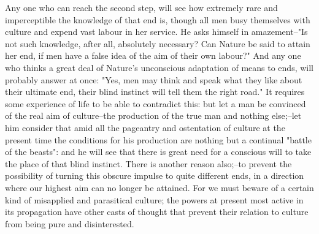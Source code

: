 Any one who can reach the second step, will see how extremely rare
and imperceptible the knowledge of that end is, though all men busy
themselves with culture and expend vast labour in her service. He
asks himself in amazement--"Is not such knowledge, after all,
absolutely necessary? Can Nature be said to attain her end, if men
have a false idea of the aim of their own labour?" And any one who
thinks a great deal of Nature's unconscious adaptation of means to
ends, will probably answer at once: "Yes, men may think and speak
what they like about their ultimate end, their blind instinct will
tell them the right road." It requires some experience of life to be
able to contradict this: but let a man be convinced of the real aim
of culture--the production of the true man and nothing else;--let him
consider that amid all the pageantry and ostentation of culture at
the present time the conditions for his production are nothing but a
continual "battle of the beasts": and he will see that there is great
need for a conscious will to take the place of that blind instinct.
There is another reason also;--to prevent the possibility of turning
this obscure impulse to quite different ends, in a direction where
our highest aim can no longer be attained. For we must beware of a
certain kind of misapplied and parasitical culture; the powers at
present most active in its propagation have other casts of thought
that prevent their relation to culture from being pure and
disinterested.

